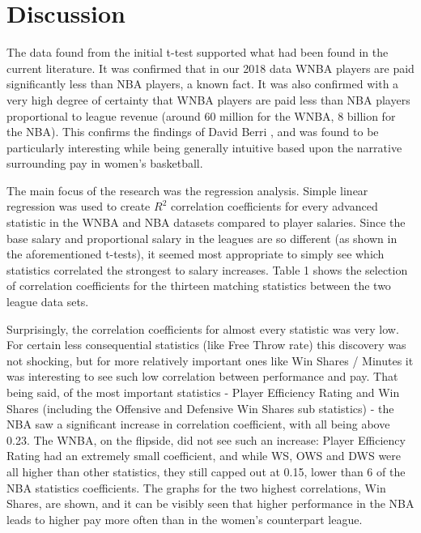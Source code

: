 \documentclass[12pt]{article}
\begin{document}
\section{Discussion}
\hspace*{10mm}
The data found from the initial t-test supported what had been found in the current literature. It was confirmed that in our 2018 data WNBA players are 
paid significantly less than NBA players, a known fact. It was also confirmed with a very high degree of certainty that WNBA players are paid less than 
NBA players proportional to league revenue (around 60 million for the WNBA, 8 billion for the NBA). This confirms the findings of David Berri \citep{WNBA_Revenue}, and was found 
to be particularly interesting while being generally intuitive based upon the narrative surrounding pay in women’s basketball.
\par
The main focus of the research was the regression analysis. Simple linear regression was used to create $R^2$ correlation coefficients for every advanced 
statistic in the WNBA and NBA datasets compared to player salaries. Since the base salary and proportional salary in the leagues are so different (as 
shown in the aforementioned t-tests), it seemed most appropriate to simply see which statistics correlated the strongest to salary increases. Table 1 
shows the selection of correlation coefficients for the thirteen matching statistics between the two league data sets.
\par
Surprisingly, the correlation coefficients for almost every statistic was very low. For certain less consequential statistics (like Free Throw rate) this 
discovery was not shocking, but for more relatively important ones like Win Shares / Minutes it was interesting to see such low correlation between 
performance and pay. That being said, of the most important statistics - Player Efficiency Rating and Win Shares (including the Offensive and Defensive 
Win Shares sub statistics) - the NBA saw a significant increase in correlation coefficient, with all being above 0.23. The WNBA, on the flipside, did not 
see such an increase: Player Efficiency Rating had an extremely small coefficient, and while WS, OWS and DWS were all higher than other statistics, they 
still capped out at 0.15, lower than 6 of the NBA statistics coefficients. The graphs for the two highest correlations, Win Shares, are shown, and it can 
be visibly seen that higher performance in the NBA leads to higher pay more often than in the women’s counterpart league.
\par
\end{document}
